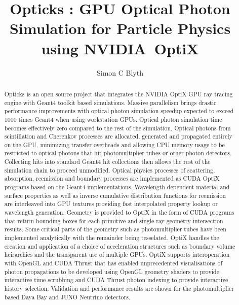 \documentclass[a4paper]{jpconf}
\begin{document}
\title{Opticks : GPU Optical Photon Simulation for Particle Physics using NVIDIA\textregistered\ OptiX\texttrademark}

\author{Simon C Blyth}

\address{HEP Lab, Department of Physics, National Taiwan University, Taipei, Taiwan.}


\begin{abstract}
Opticks is an open source project that integrates the NVIDIA OptiX 
GPU ray tracing engine with Geant4 toolkit based simulations.
Massive parallelism brings drastic performance improvements with  
optical photon simulation speedup expected to exceed 1000 times Geant4 
when using workstation GPUs. Optical photon simulation time becomes 
effectively zero compared to the rest of the simulation.
Optical photons from scintillation and Cherenkov processes
are allocated, generated and propagated entirely on the GPU, minimizing 
transfer overheads and allowing CPU memory usage to be restricted to
optical photons that hit photomultiplier tubes or other photon detectors.
Collecting hits into standard Geant4 hit collections then allows the 
rest of the simulation chain to proceed unmodified.
Optical physics processes of scattering, absorption, reemission and 
boundary processes are implemented as CUDA OptiX programs based on the Geant4
implementations. Wavelength dependent material and surface properties as well as  
inverse cumulative distribution functions for reemission are interleaved into 
GPU textures providing fast interpolated property lookup or wavelength generation.
Geometry is provided to OptiX in the form of CUDA programs that return bounding boxes 
for each primitive and single ray geometry intersection results. Some critical parts 
of the geometry such as photomultiplier tubes have been implemented analytically 
with the remainder being tesselated. 
OptiX handles the creation and application of a choice of acceleration structures
such as boundary volume heirarchies and the transparent use of multiple GPUs. 
OptiX supports interoperation with OpenGL and CUDA Thrust that has enabled 
unprecedented visualisations of photon propagations to be developed 
using OpenGL geometry shaders to provide interactive time scrubbing and    
CUDA Thrust photon indexing to provide interactive history selection. 
Validation and performance results are shown for the photomultiplier based 
Daya Bay and JUNO Neutrino detectors. 
\end{abstract}
\end{document}
